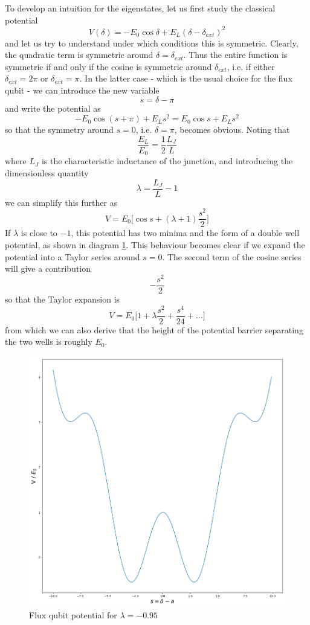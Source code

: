 \documentclass[a4paper, draft]{article}
\theoremstyle{own}
\theoremstyle{remark}
\begin{document}
To develop an intuition for the eigenstates, let us first study the classical potential
$$
V(\delta) = - E_0 \cos \delta + E_L ( \delta  - \delta_{ext})^2
$$
and let us try to understand under which conditions this is symmetric. Clearly, the quadratic term is symmetric around $\delta = \delta_{ext}$. Thus the entire function is symmetric if and only if the cosine is symmetric around $\delta_{ext}$, i.e. if either $\delta_{ext} = 2\pi$ or $\delta_{ext} = \pi$. In the latter case - which is the usual choice for the flux qubit -  we can introduce the new variable
$$
s = \delta - \pi
$$
and write the potential as
$$
- E_0 \cos (s + \pi) + E_L s^2 = E_0 \cos s + E_L s^2
$$
so that the symmetry around $s = 0$, i.e. $\delta = \pi$, becomes obvious. Noting that
$$
\frac{E_L}{E_0} = \frac{1}{2} \frac{L_J}{L}
$$ 
where $L_J$ is the characteristic inductance of the junction, and introducing the dimensionless quantity 
$$
\lambda = \frac{L_J}{L} - 1
$$
we can simplify this further as
$$
V = E_0 \big[ \cos s + (\lambda + 1) \frac{s^2}{2}\big] 
$$
If $\lambda $ is close to $-1$, this potential has two minima and the form of a double well potential, as shown in diagram \ref{fig:FluxQubitDoubleWellPotential}. This behaviour becomes clear if we expand the potential into a Taylor series around $s = 0$. The second term of the cosine series will give a contribution 
$$
- \frac{s^2}{2}
$$
so that the Taylor expansion is
$$
V = E_0 \big[ 1 + \lambda \frac{s^2}{2} + \frac{s^4}{24} + \dots \big] 
$$
from which we can also derive that the height of the potential barrier separating the two wells is roughly $E_0$. 

\begin{figure}[ht]
\centering
\includegraphics[width=0.7\linewidth]{images/FluxQubitDoubleWellPotential}
\caption[Flux qubit potential for $\lambda = -0.95$]{Flux qubit potential for $\lambda = -0.95$}
\label{fig:FluxQubitDoubleWellPotential}
\end{figure}
\end{document}
